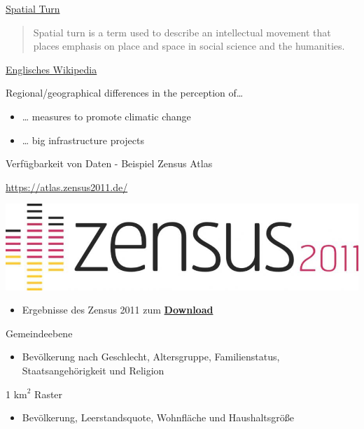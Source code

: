 \documentclass[ignorenonframetext,]{beamer}
\providecommand{\tightlist}{%
  \setlength{\itemsep}{0pt}\setlength{\parskip}{0pt}}
\begin{document}
\begin{frame}{\href{https://de.wikipedia.org/wiki/Spatial_turn}{Spatial
Turn}}

\begin{quote}
Spatial turn is a term used to describe an intellectual movement that
places emphasis on place and space in social science and the humanities.
\end{quote}

\href{https://en.wikipedia.org/wiki/Spatial_turn}{Englisches Wikipedia}

\end{frame}

\begin{frame}{Regional/geographical differences in the perception
of\ldots{}}

\begin{itemize}
\tightlist
\item
  \ldots{} measures to promote climatic change
\item
  \ldots{} big infrastructure projects
\end{itemize}

\end{frame}

\begin{frame}{Verfügbarkeit von Daten - Beispiel Zensus Atlas}

\url{https://atlas.zensus2011.de/}

\includegraphics{figure/zensus2011_logo.jpg}

\begin{itemize}
\tightlist
\item
  Ergebnisse des Zensus 2011 zum
  \href{https://www.zensus2011.de/SharedDocs/Aktuelles/Ergebnisse/DemografischeGrunddaten.html?nn=3065474}{\textbf{Download}}
\end{itemize}

\begin{block}{Gemeindeebene}

\begin{itemize}
\tightlist
\item
  Bevölkerung nach Geschlecht, Altersgruppe, Familienstatus,
  Staatsangehörigkeit und Religion
\end{itemize}

\end{block}

\begin{block}{1 \(\text{km}^2\) Raster}

\begin{itemize}
\tightlist
\item
  Bevölkerung, Leerstandsquote, Wohnfläche und Haushaltsgröße
\end{itemize}

\end{block}

\end{frame}
\end{document}
